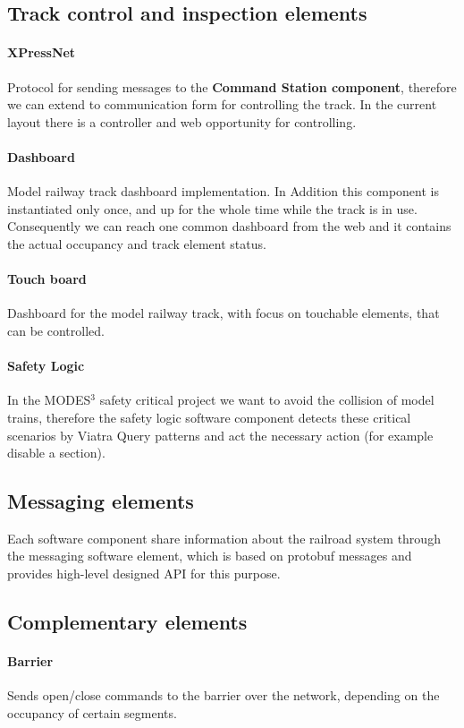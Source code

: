 \subsection{Track control and inspection elements}
\paragraph{XPressNet}
Protocol for sending messages to the \textbf{Command Station component}, therefore we can extend to communication form for controlling the track. In the current layout there is a controller and web opportunity for controlling.
\paragraph{Dashboard}
Model railway track dashboard implementation. In Addition this component is instantiated only once, and up for the whole time while the track is in use. Consequently we can reach one common dashboard from the web and it contains the actual occupancy and track element status.
\paragraph{Touch board}
Dashboard for the model railway track, with focus on touchable elements, that can be controlled.
\paragraph{Safety Logic}
In the MODES$^3$ safety critical project we want to avoid the collision of model trains, therefore the safety logic software component detects these critical scenarios by Viatra Query patterns and act the necessary action (for example disable a section).

\subsection{Messaging elements}
Each software component share information about the railroad system through the messaging software element, which is based on protobuf messages and provides high-level designed API for this purpose. 

\subsection{Complementary elements}
\paragraph{Barrier} 
Sends open/close commands to the barrier over the network, depending on the occupancy of certain segments.
